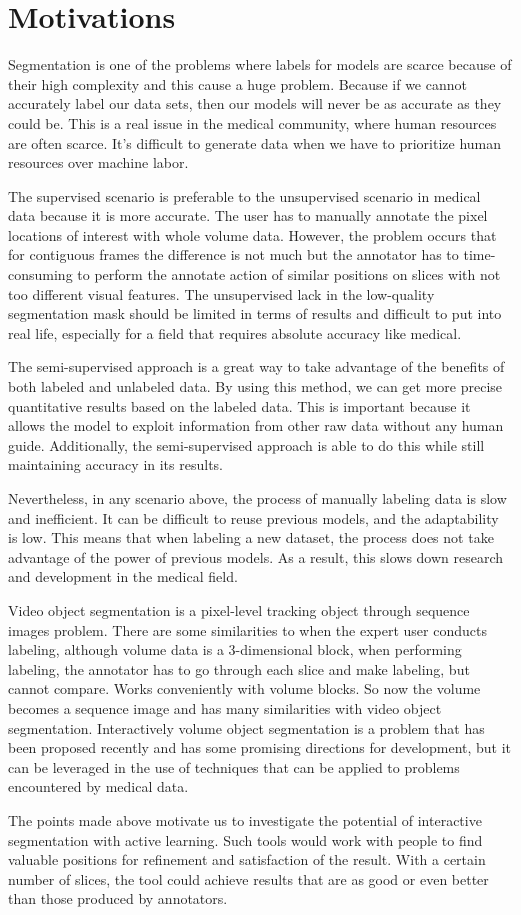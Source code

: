\section{Motivations}
\label{sec:motivation}
Segmentation is one of the problems where labels for models are scarce because of their high complexity and this cause a huge problem. Because if we cannot accurately label our data sets, then our models will never be as accurate as they could be. This is a real issue in the medical community, where human resources are often scarce. It's difficult to generate data when we have to prioritize human resources over machine labor. 

The supervised scenario is preferable to the unsupervised scenario in medical data because it is more accurate. The user has to manually annotate the pixel locations of interest with whole volume data. However, the problem occurs that for contiguous frames the difference is not much but the annotator has to time-consuming to perform the annotate action of similar positions on slices with not too different visual features. The unsupervised lack in the low-quality segmentation mask should be limited in terms of results and difficult to put into real life, especially for a field that requires absolute accuracy like medical.

The semi-supervised approach is a great way to take advantage of the benefits of both labeled and unlabeled data. By using this method, we can get more precise quantitative results based on the labeled data. This is important because it allows the model to exploit information from other raw data without any human guide. Additionally, the semi-supervised approach is able to do this while still maintaining accuracy in its results.

Nevertheless, in any scenario above, the process of manually labeling data is slow and inefficient. It can be difficult to reuse previous models, and the adaptability is low. This means that when labeling a new dataset, the process does not take advantage of the power of previous models. As a result, this slows down research and development in the medical field.

Video object segmentation is a pixel-level tracking object through sequence images problem. There are some similarities to when the expert user conducts labeling, although volume data is a 3-dimensional block, when performing labeling, the annotator has to go through each slice and make labeling, but cannot compare. Works conveniently with volume blocks. So now the volume becomes a sequence image and has many similarities with video object segmentation. Interactively volume object segmentation is a problem that has been proposed recently and has some promising directions for development, but it can be leveraged in the use of techniques that can be applied to problems encountered by medical data.

The points made above motivate us to investigate the potential of interactive segmentation with active learning. Such tools would work with people to find valuable positions for refinement and satisfaction of the result. With a certain number of slices, the tool could achieve results that are as good or even better than those produced by annotators.

